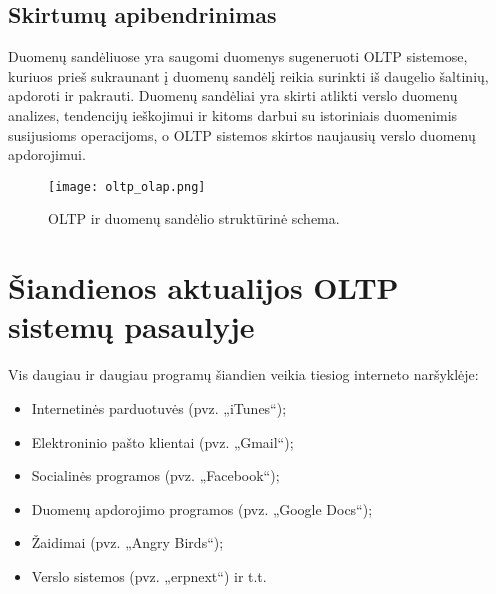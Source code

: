 \documentclass[12pt,a4paper,titlepage]{article}
\begin{document}
\subsection{Skirtumų apibendrinimas}

Duomenų sandėliuose yra saugomi duomenys sugeneruoti OLTP sistemose, kuriuos prieš sukraunant į duomenų sandėlį reikia surinkti iš daugelio šaltinių, apdoroti ir pakrauti. Duomenų sandėliai yra skirti atlikti verslo duomenų analizes, tendencijų ieškojimui ir kitoms darbui su istoriniais duomenimis susijusioms operacijoms, o OLTP sistemos skirtos naujausių verslo duomenų apdorojimui.

\begin{figure}[htb]
\begin{center}
\leavevmode
\texttt{[image: oltp\_olap.png]}
\end{center}
\caption{OLTP ir duomenų sandėlio struktūrinė schema.}
\label{fig:awesome_image}
\end{figure}

\newpage

\section{Šiandienos aktualijos OLTP sistemų pasaulyje}

Vis daugiau ir daugiau programų šiandien veikia tiesiog interneto naršyklėje:
\begin{itemize}
  \item Internetinės parduotuvės (pvz. „iTunes“);
  \item Elektroninio pašto klientai (pvz. „Gmail“);
  \item Socialinės programos (pvz. „Facebook“);
  \item Duomenų apdorojimo programos (pvz. „Google Docs“);
  \item Žaidimai (pvz. „Angry Birds“);
  \item Verslo sistemos (pvz. „erpnext“) ir t.t.
\end{itemize}
\end{document}
